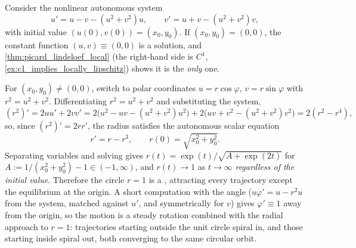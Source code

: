 \begin{example}
\label{ex:autonomous_limit_cycle}
Consider the nonlinear autonomous system
\[u' = u-v-(u^2+v^2)u, \qquad v' = u+v-(u^2+v^2)v,\]
with initial value $(u(0),v(0))=(x_0,y_0)$. If $(x_0,y_0)=(0,0)$, the constant function
$(u,v)\equiv(0,0)$ is a solution, and \cref{thm:picard_lindeloef_local} (the right-hand side is
$C^1$, \cref{ex:c1_implies_locally_lipschitz}) shows it is the \emph{only} one.

For $(x_0,y_0) \neq (0,0)$, switch to polar coordinates $u=r\cos\varphi$, $v=r\sin\varphi$ with
$r^2=u^2+v^2$. Differentiating $r^2=u^2+v^2$ and substituting the system,
\[(r^2)' = 2uu'+2vv' = 2\big(u^2-uv-(u^2+v^2)u^2\big) + 2\big(uv+v^2-(u^2+v^2)v^2\big)
  = 2(r^2-r^4),\]
so, since $(r^2)'=2rr'$, the radius satisfies the autonomous scalar equation
\[r' = r-r^3, \qquad r(0)=\sqrt{x_0^2+y_0^2}.\]
Separating variables and solving gives $r(t) = \exp(t)/\sqrt{A+\exp(2t)}$ for
$A := 1/(x_0^2+y_0^2)-1 \in (-1,\infty)$, and $r(t) \to 1$ as $t \to \infty$
\emph{regardless of the initial value}. Therefore the circle $r=1$ is a 
, attracting every trajectory except the equilibrium at the origin. A
short computation with the angle ($u\varphi'=u-r^2u$ from the system, matched against $u'$, and
symmetrically for $v$) gives $\varphi'\equiv1$ away from the origin, so the motion is a steady
rotation combined with the radial approach to $r=1$: trajectories starting outside the unit
circle spiral in, and those starting inside spiral out, both converging to the same circular
orbit.
\begin{center}
\end{center}
\end{example}

